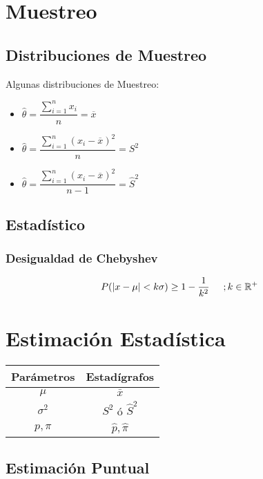 \documentclass[10pt,letterpaper]{article}
\begin{document}
\section{Muestreo}
\subsection{Distribuciones de Muestreo}
Algunas distribuciones de Muestreo:
\begin{multicols}{3}
\begin{itemize}
\item $\widehat{\theta}=\dfrac{\displaystyle\sum_{i=1}^{n} x_i}{n}=\overline{x}$
\end{itemize}
\columnbreak
\begin{itemize}
\item $\widehat{\theta}=\dfrac{\displaystyle\sum_{i=1}^{n} (x_i-\overline{x})^2}{n}=S^2$
\end{itemize}
\columnbreak
\begin{itemize}
\item $\widehat{\theta}=\dfrac{\displaystyle\sum_{i=1}^{n} (x_i-\overline{x})^2}{n-1}=\widehat{S}^2$
\end{itemize}
\end{multicols}
\subsection{Estadístico}
\subsubsection{Desigualdad de Chebyshev}
$$
P(|x-\mu|<k\sigma) \geq 1-\dfrac{1}{k^2} \hspace{0.5cm};k\in \mathbb{R^+}
$$
\section{Estimación Estadística}
\begin{center}
 \begin{tabular}{|c|c|}
\hline 
Parámetros & Estadígrafos \\ 
\hline 
$\mu$ & $\bar{x}$ \\ 
$\sigma^2$ & $S^2$ ó $\hat{S}^2$ \\
$p,\pi$ & $\hat{p},\hat{\pi}$\\
\hline 
\end{tabular}
 \end{center} 
\subsection{Estimación Puntual}
\end{document}
